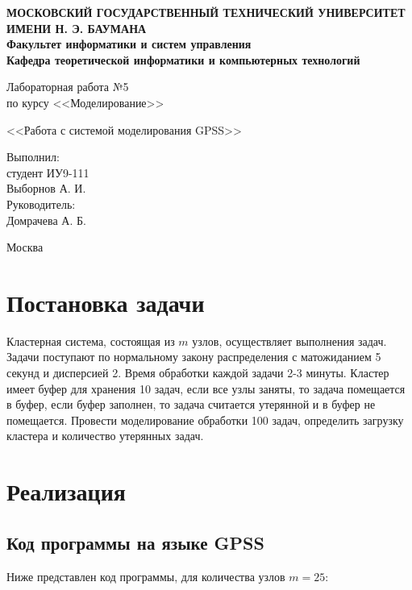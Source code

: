 \documentclass[12pt,a4paper,oneside]{extarticle}
\begin{document}
\pgfplotsset{compat=1.8}

\thispagestyle{empty}
\newpage
{
\centering


\textbf{
МОСКОВСКИЙ ГОСУДАРСТВЕННЫЙ ТЕХНИЧЕСКИЙ УНИВЕРСИТЕТ ИМЕНИ Н. Э. БАУМАНА \\
Факультет информатики и систем управления \\
Кафедра теоретической информатики и компьютерных технологий}
\bigskip
\bigskip
\bigskip
\bigskip
\bigskip
\bigskip
\bigskip

\vfill


Лабораторная работа №5 \\
по курсу <<Моделирование>>

\bigskip

{\large <<Работа с системой моделирования GPSS>>}
\bigskip

\vfill



\hfill\parbox{4cm} {
Выполнил:\\
студент ИУ9-111 \hfill \\
Выборнов А. И.\hfill \medskip\\
Руководитель:\\
Домрачева А. Б.\hfill
}


\vspace{\fill}

Москва \number\year
\clearpage
}



\clearpage


\section{Постановка задачи}
    Кластерная система, состоящая из $m$ узлов, осуществляет выполнения задач. Задачи поступают по нормальному закону распределения с матожиданием 5 секунд и дисперсией 2. Время обработки каждой задачи 2-3 минуты. Кластер имеет буфер для хранения 10 задач, если все узлы заняты, то задача помещается в буфер, если буфер заполнен, то задача считается утерянной и в буфер не помещается. Провести моделирование обработки 100 задач, определить загрузку кластера и количество утерянных задач.


\section{Реализация}
    \subsection{Код программы на языке GPSS}
    Ниже представлен код программы, для количества узлов $m = 25$:
    \label{sec:gpss}
\end{document}
